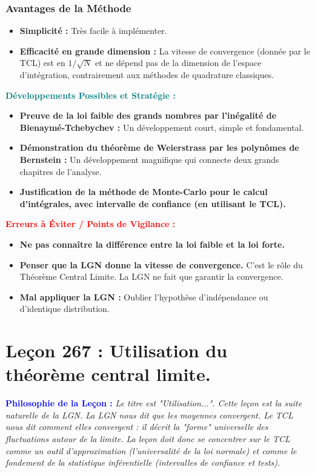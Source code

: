 \documentclass[12pt, a4paper, parskip=full]{report}
\theoremstyle{agregstyle}
\newenvironment{philosophie}
  {\par\medskip\noindent\begin{oframed}\noindent\textbf{\textcolor{blue}{Philosophie de la Leçon :}}\itshape}
  {\end{oframed}\par\medskip}
\newenvironment{developpements}
  {\par\medskip\noindent\begin{oframed}\noindent\textbf{\textcolor{teal}{Développements Possibles et Stratégie :}}}
  {\end{oframed}\par\medskip}
\newenvironment{erreurs}
  {\par\medskip\noindent\begin{oframed}\noindent\textbf{\textcolor{red}{Erreurs à Éviter / Points de Vigilance :}}}
  {\end{oframed}\par\medskip}
\begin{document}
\subsection{Avantages de la Méthode}
\begin{itemize}
    \item \textbf{Simplicité :} Très facile à implémenter.
    \item \textbf{Efficacité en grande dimension :} La vitesse de convergence (donnée par le TCL) est en $1/\sqrt{N}$ et ne dépend pas de la dimension de l'espace d'intégration, contrairement aux méthodes de quadrature classiques.
\end{itemize}

\begin{developpements}
    \begin{itemize}
        \item \textbf{Preuve de la loi faible des grands nombres par l'inégalité de Bienaymé-Tchebychev :} Un développement court, simple et fondamental.
        \item \textbf{Démonstration du théorème de Weierstrass par les polynômes de Bernstein :} Un développement magnifique qui connecte deux grands chapitres de l'analyse.
        \item \textbf{Justification de la méthode de Monte-Carlo pour le calcul d'intégrales, avec intervalle de confiance (en utilisant le TCL).}
    \end{itemize}
\end{developpements}

\begin{erreurs}
    \begin{itemize}
        \item \textbf{Ne pas connaître la différence entre la loi faible et la loi forte.}
        \item \textbf{Penser que la LGN donne la vitesse de convergence.} C'est le rôle du Théorème Central Limite. La LGN ne fait que garantir la convergence.
        \item \textbf{Mal appliquer la LGN :} Oublier l'hypothèse d'indépendance ou d'identique distribution.
    \end{itemize}
\end{erreurs}
\chapter{Leçon 267 : Utilisation du théorème central limite.}

\begin{philosophie}
    Le titre est "Utilisation...". Cette leçon est la suite naturelle de la LGN. La LGN nous dit que les moyennes convergent. Le TCL nous dit \textit{comment} elles convergent : il décrit la "forme" universelle des fluctuations autour de la limite. La leçon doit donc se concentrer sur le TCL comme un outil d'approximation (l'universalité de la loi normale) et comme le fondement de la statistique inférentielle (intervalles de confiance et tests).
\end{philosophie}
\end{document}

